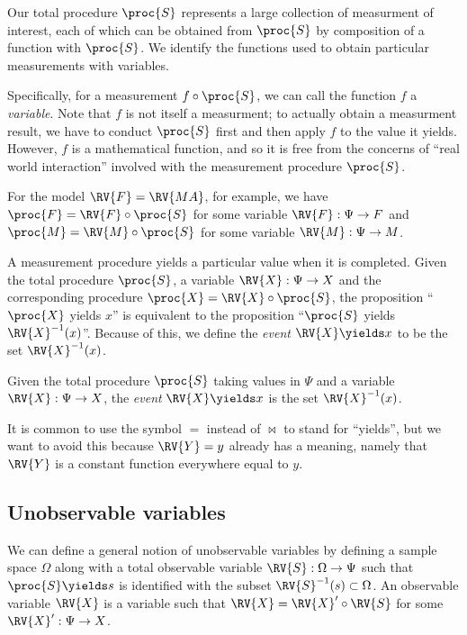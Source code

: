 Our total procedure $\proc{S}$ represents a large collection of measurment of interest, each of which can be obtained from $\proc{S}$ by composition of a function with $\proc{S}$. We identify the functions used to obtain particular measurements with variables.

Specifically, for a measurement $f\circ \proc{S}$, we can call the function $f$ a \emph{variable}. Note that $f$ is not itself a measurment; to actually obtain a measurment result, we have to conduct $\proc{S}$ first and then apply $f$ to the value it yields. However, $f$ is a mathematical function, and so it is free from the concerns of ``real world interaction'' involved with the measurement procedure $\proc{S}$.

For the model $\RV{F}=\RV{MA}$, for example, we have $\proc{F}=\RV{F}\circ \proc{S}$ for some variable $\RV{F}:\Psi\to F$ and $\proc{M}=\RV{M}\circ \proc{S}$ for some variable $\RV{M}:\Psi\to M$.

A measurement procedure yields a particular value when it is completed. Given the total procedure $\proc{S}$, a variable $\RV{X}:\Psi\to X$ and the corresponding procedure $\proc{X}=\RV{X}\circ\proc{S}$, the proposition ``$\proc{X}$ yields $x$'' is equivalent to the proposition ``$\proc{S}$ yields $\RV{X}^{-1}(x)$''. Because of this, we define the \emph{event} $\RV{X}\yields x$ to be the set $\RV{X}^{-1}(x)$.

\begin{definition}[Event]
Given the total procedure $\proc{S}$ taking values in $\Psi$ and a variable $\RV{X}:\Psi\to X$, the \emph{event} $\RV{X}\yields x$ is the set $\RV{X}^{-1}(x)$.
\end{definition}

It is common to use the symbol $=$ instead of $\bowtie$ to stand for ``yields'', but we want to avoid this because $\RV{Y}=y$ already has a meaning, namely that $\RV{Y}$ is a constant function everywhere equal to $y$. 

\subsection{Unobservable variables}

We can define a general notion of unobservable variables by defining a sample space $\Omega$ along with a total observable variable $\RV{S}:\Omega\to \Psi$ such that $\proc{S}\yields s$ is identified with the subset $\RV{S}^{-1}(s)\subset \Omega$. An observable variable $\RV{X}$ is a variable such that $\RV{X}=\RV{X}'\circ\RV{S}$ for some $\RV{X}':\Psi\to X$.

